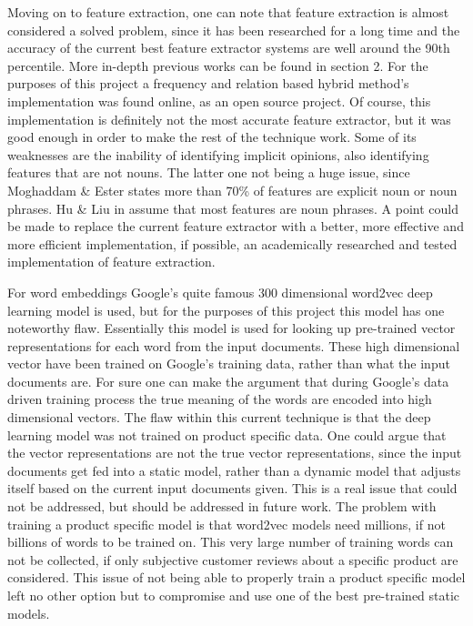 \documentclass{sig-alternate}
\begin{document}
Moving on to feature extraction, one can note that feature extraction is almost considered a solved problem, since it has been researched for a long time and the accuracy of the current best feature extractor systems are well around the 90th percentile. More in-depth previous works can be found in section 2. For the purposes of this project a frequency and relation based hybrid method's implementation was found online, as an open source project\cite{Bansal2014}. Of course, this implementation is definitely not the most accurate feature extractor, but it was good enough in order to make the rest of the technique work. Some of its weaknesses are the inability of identifying implicit opinions, also identifying features that are not nouns. The latter one not being a huge issue, since Moghaddam \& Ester\cite{MoghaddamEster2010} states more than 70\% of features are explicit noun or noun phrases. Hu \& Liu in\cite{HuLiu2004} assume that most features are noun phrases. A point could be made to replace the current feature extractor with a better, more effective and more efficient implementation, if possible, an academically researched and tested implementation of feature extraction.

For word embeddings Google's quite famous 300 dimensional word2vec deep learning model\cite{MikolovChenCorradoDean2013a} is used, but for the purposes of this project this model has one noteworthy flaw. Essentially this model is used for looking up pre-trained vector representations for each word from the input documents. These high dimensional vector have been trained on Google's training data, rather than what the input documents are. For sure one can make the argument that during Google's data driven training process the true meaning of the words are encoded into high dimensional vectors. The flaw within this current technique is that the deep learning model was not trained on product specific data. One could argue that the vector representations are not the true vector representations, since the input documents get fed into a static model, rather than a dynamic model that adjusts itself based on the current input documents given. This is a real issue that could not be addressed, but should be addressed in future work. The problem with training a product specific model is that word2vec models need millions, if not billions of words to be trained on. This very large number of training words can not be collected, if only subjective customer reviews about a specific product are considered. This issue of not being able to properly train a product specific model left no other option but to compromise and use one of the best pre-trained static models.
\end{document}
